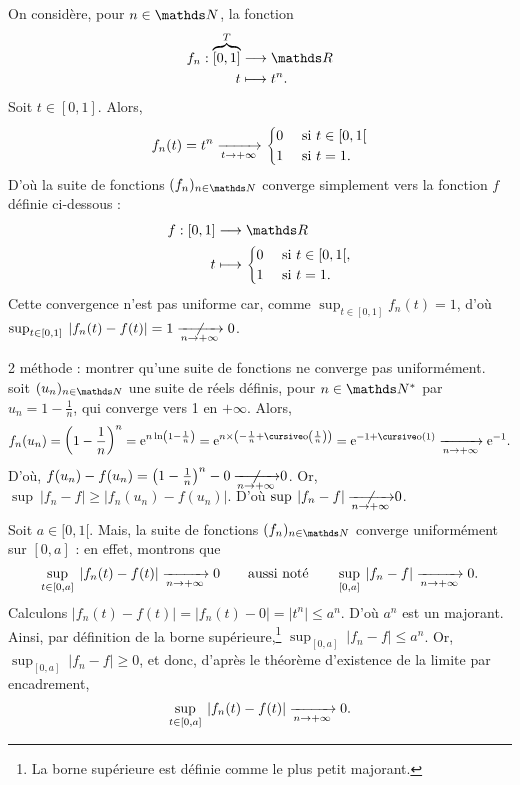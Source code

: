 \begin{exo}
	On considère, pour $n \in \N$, la fonction \begin{align*}
		f_n: \overbrace{[0,1]}^T &\longrightarrow \R \\
		t &\longmapsto t^n.
	\end{align*}
	Soit $t \in [0,1]$. Alors, \[
		f_n(t) = t^n \xrightarrow[t\to +\infty]{} \begin{cases}
			0 &\text{ si } t \in [0,1[\\
			1 &\text{ si } t = 1.
		\end{cases}
	\]
	D'où la suite de fonctions $(f_n)_{n\in\N}$\/ converge simplement vers la fonction $f$\/ définie ci-dessous : 
	\begin{align*}
		f: [0,1] &\longrightarrow \R \\
		t &\longmapsto \begin{cases}
			0&\text{ si } t \in [0,1[,\\
			1&\text{ si } t = 1.
		\end{cases}
	\end{align*}
	Cette convergence n'est {\color{red}pas} uniforme car, comme $\sup_{t \in [0,1]} f_n(t) = 1$, d'où $\sup_{t \in [0,1]}\:|f_n(t) - f(t)| = 1 \centernot{\tendsto{n\to +\infty}} 0$.

	\bigskip
	\bigskip

	2 méthode : montrer qu'une suite de fonctions ne converge pas uniformément. 
	soit $(u_n)_{n\in\N}$\/ une suite de réels définis, pour $n \in \N^*$\/ par $u_n = 1 - \frac{1}{n}$, qui converge vers 1 en $+\infty$. Alors, \[
		f_n(u_n) = \left( 1 - \frac{1}{n} \right)^n = \mathrm{e}^{n \ln \left( 1 - \frac{1}{n} \right)} = \mathrm{e}^{n \times \left( -\frac{1}{n} + \po\left( \frac{1}{n} \right)  \right)} = \mathrm{e}^{-1 + \po(1)} \tendsto{n\to +\infty} \mathrm{e}^{-1}
	.\] D'où, $f(u_n) - f(u_n) = \left( 1 - \frac{1}{n} \right)^n - 0\:\smash{\centernot{\tendsto{n\to +\infty}}} 0$.
	Or, $\sup\:|f_n - f| \ge  |f_n(u_n) - f(u_n)|$. D'où $\sup\:|f_n - f|\:\smash{\centernot{\tendsto{n\to +\infty}}} 0$.

	\bigskip
	\bigskip

	Soit $a \in [0,1[$. Mais, la suite de fonctions $(f_n)_{n\in\N}$\/ converge uniformément sur $[0,a]$\/ : en effet, montrons que \[
		\sup_{t \in [0,a]}\:\left| f_n(t) - f(t) \right|  \xrightarrow[n\to +\infty]{} 0
		\qquad\text{aussi noté}\qquad
		\sup_{[0,a]}\:\left| f_n - f \right|  \xrightarrow[n\to +\infty]{} 0
	.\] Calculons $|f_n(t) - f(t)| = |f_n(t) - 0| = |t^n| \le a^n$. D'où $a^n$\/ est un majorant. Ainsi, par définition de la borne supérieure,\footnote{La borne supérieure est définie comme le plus petit majorant.} $\sup_{[0,a]}\:|f_n - f| \le a^n$. Or, $\sup_{[0,a]}\:|f_n - f| \ge 0$, et donc, d'après le théorème d'existence de la limite par encadrement, \[
		\sup_{t \in [0,a]}\:|f_n(t) - f(t)| \xrightarrow[n\to +\infty]{} 0
	.\]
\end{exo}


